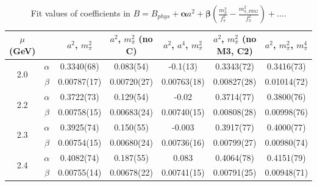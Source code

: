\documentclass[12pt]{extarticle}
\begin{document}
\begin{table}[h!]
\begin{center}
\begin{tabular}{|c c|c|c|c|c|c|}
\hline
$\mu$ (GeV) &  & $a^2$, $m_\pi^2$& $a^2$, $m_\pi^2$ (no C)& $a^2$, $a^4$, $m_\pi^2$& $a^2$, $m_\pi^2$ (no M3, C2)& $a^2$, $m_\pi^2$, $m_\pi^4$\\
\hline
\multirow{2}{0.5in}{2.0} & $\alpha$ & 0.3340(68)& 0.083(54)& -0.1(13)& 0.3343(72)& 0.3416(73)\\
 & $\beta$ & 0.00787(17)& 0.00720(27)& 0.00763(18)& 0.00827(28)& 0.01014(72)\\
\hline
\multirow{2}{0.5in}{2.2} & $\alpha$ & 0.3722(73)& 0.129(54)& -0.02& 0.3714(77)& 0.3800(76)\\
 & $\beta$ & 0.00758(15)& 0.00683(24)& 0.00740(15)& 0.00808(28)& 0.00998(76)\\
\hline
\multirow{2}{0.5in}{2.3} & $\alpha$ & 0.3925(74)& 0.150(55)& -0.003& 0.3917(77)& 0.4000(77)\\
 & $\beta$ & 0.00754(15)& 0.00680(24)& 0.00736(16)& 0.00799(27)& 0.00980(74)\\
\hline
\multirow{2}{0.5in}{2.4} & $\alpha$ & 0.4082(74)& 0.187(55)& 0.083& 0.4064(78)& 0.4151(79)\\
 & $\beta$ & 0.00755(14)& 0.00678(22)& 0.00741(15)& 0.00791(25)& 0.00948(71)\\
\hline
\end{tabular}
\caption{Fit values of coefficients in $B = B_{phys} + \mathbf{\alpha} a^2 + \mathbf{\beta}\left(\frac{m_\pi^2}{f_\pi^2}-\frac{m_{\pi,PDG}^2}{f_\pi^2}\right) + \ldots$.}
\end{center}
\end{table}




















\clearpage
\end{document}
